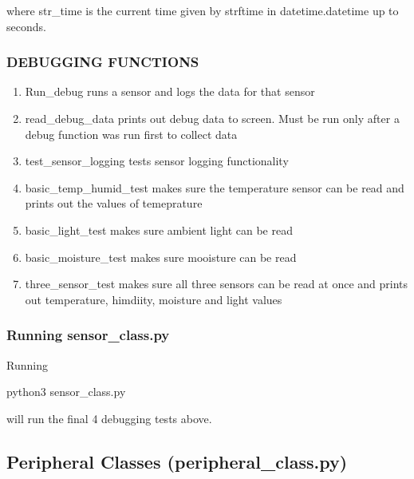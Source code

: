 \documentclass[
]{article}
\newenvironment{Shaded}{}{}
\newcommand{\ExtensionTok}[1]{#1}
\newcommand{\NormalTok}[1]{#1}
\providecommand{\tightlist}{%
  \setlength{\itemsep}{0pt}\setlength{\parskip}{0pt}}
\begin{document}
where str\_time is the current time given by strftime in
datetime.datetime up to seconds.

\hypertarget{debugging-functions}{%
\subsubsection{DEBUGGING FUNCTIONS}\label{debugging-functions}}

\begin{enumerate}
\def\labelenumi{\arabic{enumi}.}
\tightlist
\item
  Run\_debug runs a sensor and logs the data for that sensor
\item
  read\_debug\_data prints out debug data to screen. Must be run only
  after a debug function was run first to collect data
\item
  test\_sensor\_logging tests sensor logging functionality
\item
  basic\_temp\_humid\_test makes sure the temperature sensor can be read
  and prints out the values of temeprature
\item
  basic\_light\_test makes sure ambient light can be read
\item
  basic\_moisture\_test makes sure mooisture can be read
\item
  three\_sensor\_test makes sure all three sensors can be read at once
  and prints out temperature, himdiity, moisture and light values
\end{enumerate}

\hypertarget{running-sensor_class.py}{%
\subsubsection{Running sensor\_class.py}\label{running-sensor_class.py}}

Running

\begin{Shaded}
\begin{Highlighting}[]
\ExtensionTok{python3}\NormalTok{ sensor\_class.py}
\end{Highlighting}
\end{Shaded}

will run the final 4 debugging tests above.

\hypertarget{peripheral-classes-peripheral_class.py}{%
\subsection{Peripheral Classes
(peripheral\_class.py)}\label{peripheral-classes-peripheral_class.py}}
\end{document}
